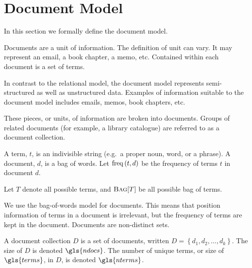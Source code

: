 \section{Document Model}
\label{sec:document-model}
	In this section we formally define the document model.
	
	Documents are a unit of information.  The definition of unit can vary.  It may represent an email, a book chapter, a memo, etc.  Contained within each document is a set of terms.
	
	In contrast to the relational model, the document model represents semi-structured as well as unstructured data.  Examples of information suitable to the document model includes emails, memos, book chapters, etc.
	
	These pieces, or units, of information are broken into documents.  Groups of related documents (for example, a library catalogue) are referred to as a document collection.

	\begin{defn}
	\label{def:document}
		A term, $t$, is an indivisible string (e.g.~a proper noun, word, or a phrase).  A document, $d$, is a bag of words.  Let $\operatorname{freq}\left(t, d\right)$ be the frequency of terms $t$ in document $d$.
		
		Let $T$ denote all possible terms, and $\textsc{Bag}\lbrack T\rbrack$ be all possible bag of terms.
	\end{defn}
	
	\begin{remark}
		We use the bag-of-words model for documents.  This means that position information of terms in a document is irrelevant, but the frequency of terms are kept in the document.  Documents are non-distinct sets.
	\end{remark}
	
	\begin{defn}
	\label{def:document-collection}
		A document collection $D$ is a set of documents, written $D = \left\{d_1, d_2, \dotsc, d_k\right\}$.  The size of $D$ is denoted $\gls{ndocs}$.  The number of unique terms, or size of $\gls{terms}$, in $D$, is denoted $\gls{nterms}$.
	\end{defn}
	
